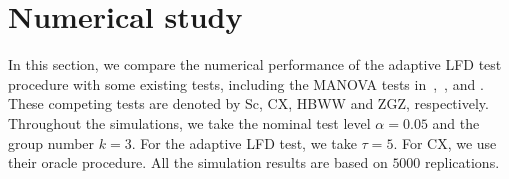 \documentclass[12pt]{article} %
\DeclareMathOperator{\mytr}{tr}
\DeclareMathOperator{\myE}{E}
\newcommand{\bX}{\mathbf{X}}
\newcommand{\bfsym}[1]{\ensuremath{\boldsymbol{#1}}}
\def\bSigma {\bfsym {\Sigma}}
\def\bTheta {\bfsym {\Theta}}
\theoremstyle{definition}
\begin{document}
%






\section{Numerical study}\label{numerical}
\setcounter{equation}{0} %

In this section, we compare the numerical performance of the adaptive LFD test procedure with some existing tests, including the MANOVA tests in~\citet{Schott2007Some},~\citet{Cai2014High}, \cite{Hu2017} and \cite{ZHANG2017200}.
These competing tests are denoted by Sc, CX, HBWW and ZGZ, respectively.
Throughout the simulations, we take the nominal test level $\alpha =0.05$ and the group number $k=3$.
For the adaptive LFD test, we take $\tau=5$.
For CX, we use their oracle procedure.
All the simulation results are based on $5000$ replications.
\end{document}
